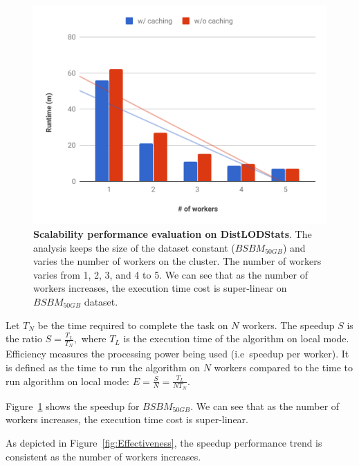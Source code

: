 \begin{figure}
\includegraphics[width=1.0\columnwidth]{images/4_distlodstats/distlodstats-node-scalability.pdf}
\caption{\textbf{Scalability performance evaluation on DistLODStats}.
The analysis keeps the size of the dataset constant ($BSBM_{50GB}$) and varies the number of workers on the cluster.
The number of workers varies from 1, 2, 3, and 4 to 5.
We can see that as the number of workers increases, the execution time cost is super-linear on $BSBM_{50GB}$ dataset.}
\label{fig:Scalability}
\end{figure}

Let $T_N$ be the time required to complete the task on $N$ workers. The speedup $S$ is the ratio
$ S = \frac{T_L}{T_N},$
where $T_L$ is the execution time of the algorithm on local mode.
Efficiency measures the processing power being used (i.e~speedup per worker). 
It is defined as the time to run the algorithm on $N$ workers compared to the time to run algorithm on local mode:
$ E = \frac{S}{N} =\frac{T_{L}}{N T_{N}}.$

Figure~\ref{fig:Scalability} shows the speedup for $BSBM_{50GB}$.
We can see that as the number of workers increases, the execution time cost is super-linear.

As depicted in Figure~\ref{fig:Effectiveness}, the speedup performance trend is consistent as the number of workers increases.

